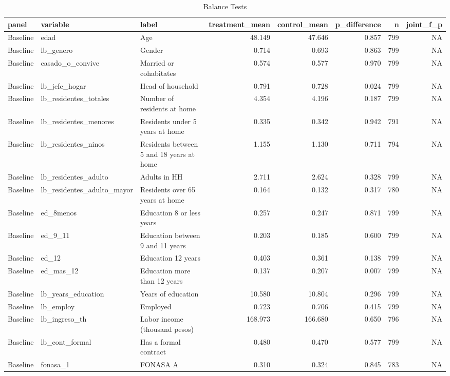 \begin{table}

\caption{Balance Tests}
\centering
\begin{tabular}[t]{lllrrrrr}
\toprule
panel & variable & label & treatment\_mean & control\_mean & p\_difference & n & joint\_f\_p\\
\midrule
Baseline & edad & Age & 48.149 & 47.646 & 0.857 & 799 & NA\\
Baseline & lb\_genero & Gender & 0.714 & 0.693 & 0.863 & 799 & NA\\
Baseline & casado\_o\_convive & Married or cohabitates & 0.574 & 0.577 & 0.970 & 799 & NA\\
Baseline & lb\_jefe\_hogar & Head of household & 0.791 & 0.728 & 0.024 & 799 & NA\\
Baseline & lb\_residentes\_totales & Number of residents at home & 4.354 & 4.196 & 0.187 & 799 & NA\\
\addlinespace
Baseline & lb\_residentes\_menores & Residents under 5 years at home & 0.335 & 0.342 & 0.942 & 791 & NA\\
Baseline & lb\_residentes\_ninos & Residents between 5 and 18 years at home & 1.155 & 1.130 & 0.711 & 794 & NA\\
Baseline & lb\_residentes\_adulto & Adults in HH & 2.711 & 2.624 & 0.328 & 799 & NA\\
Baseline & lb\_residentes\_adulto\_mayor & Residents over 65 years at home & 0.164 & 0.132 & 0.317 & 780 & NA\\
Baseline & ed\_8menos & Education 8 or less years & 0.257 & 0.247 & 0.871 & 799 & NA\\
\addlinespace
Baseline & ed\_9\_11 & Education between 9 and 11 years & 0.203 & 0.185 & 0.600 & 799 & NA\\
Baseline & ed\_12 & Education 12 years & 0.403 & 0.361 & 0.138 & 799 & NA\\
Baseline & ed\_mas\_12 & Education more than 12 years & 0.137 & 0.207 & 0.007 & 799 & NA\\
Baseline & lb\_years\_education & Years of education & 10.580 & 10.804 & 0.296 & 799 & NA\\
Baseline & lb\_employ & Employed & 0.723 & 0.706 & 0.415 & 799 & NA\\
\addlinespace
Baseline & lb\_ingreso\_th & Labor income (thousand pesos) & 168.973 & 166.680 & 0.650 & 796 & NA\\
Baseline & lb\_cont\_formal & Has a formal contract & 0.480 & 0.470 & 0.577 & 799 & NA\\
Baseline & fonasa\_1 & FONASA A & 0.310 & 0.324 & 0.845 & 783 & NA\\

\end{tabular}
\end{table}
